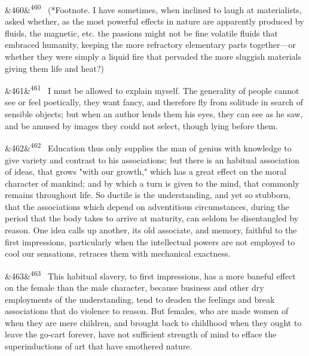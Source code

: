 \documentclass[12pt]{article}
\newcommand{\para}[1][]{\par\noindent\ifx&#1&\else\textsuperscript{\footnotesize #1}~\fi}
\begin{document}
\para[460] (*Footnote. I have sometimes, when inclined to laugh at materialists, asked whether, as the most powerful effects in nature are apparently produced by fluids, the magnetic, etc. the passions might not be fine volatile fluids that embraced humanity, keeping the more refractory elementary parts together---or whether they were simply a liquid fire that pervaded the more sluggish materials giving them life and heat?)

\para[461] I must be allowed to explain myself. The generality of people cannot see or feel poetically, they want fancy, and therefore fly from solitude in search of sensible objects; but when an author lends them his eyes, they can see as he saw, and be amused by images they could not select, though lying before them.

\para[462] Education thus only supplies the man of genius with knowledge to give variety and contrast to his associations; but there is an habitual association of ideas, that grows "with our growth," which has a great effect on the moral character of mankind; and by which a turn is given to the mind, that commonly remains throughout life. So ductile is the understanding, and yet so stubborn, that the associations which depend on adventitious circumstances, during the period that the body takes to arrive at maturity, can seldom be disentangled by reason. One idea calls up another, its old associate, and memory, faithful to the first impressions, particularly when the intellectual powers are not employed to cool our sensations, retraces them with mechanical exactness.

\para[463] This habitual slavery, to first impressions, has a more baneful effect on the female than the male character, because business and other dry employments of the understanding, tend to deaden the feelings and break associations that do violence to reason. But females, who are made women of when they are mere children, and brought back to childhood when they ought to leave the go-cart forever, have not sufficient strength of mind to efface the superinductions of art that have smothered nature.
\end{document}
